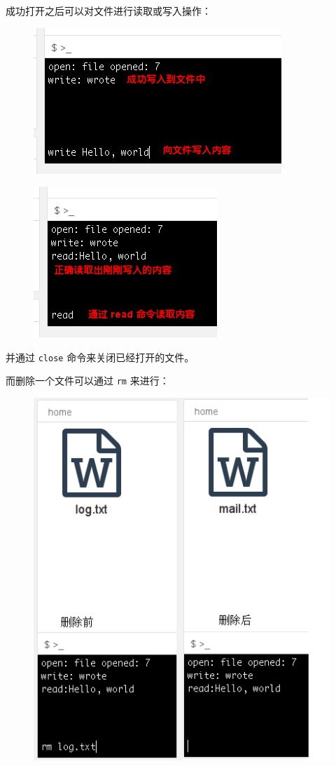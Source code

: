 \documentclass[12bp]{guo}
\begin{document}
成功打开之后可以对文件进行读取或写入操作：

\begin{figure}[h!]
    \centering
        \includegraphics[scale=0.75]{figures/fs-app.write.png}
\end{figure}

\begin{figure}[h!]
    \centering
        \includegraphics[scale=0.75]{figures/fs-app.read.png}
\end{figure}

并通过 \texttt{close} 命令来关闭已经打开的文件。


而删除一个文件可以通过 \texttt{rm} 来进行：

\begin{figure}[h!]
    \centering
        \includegraphics[scale=0.75]{figures/fs-app.rm-before.png}
\end{figure}
\end{document}
